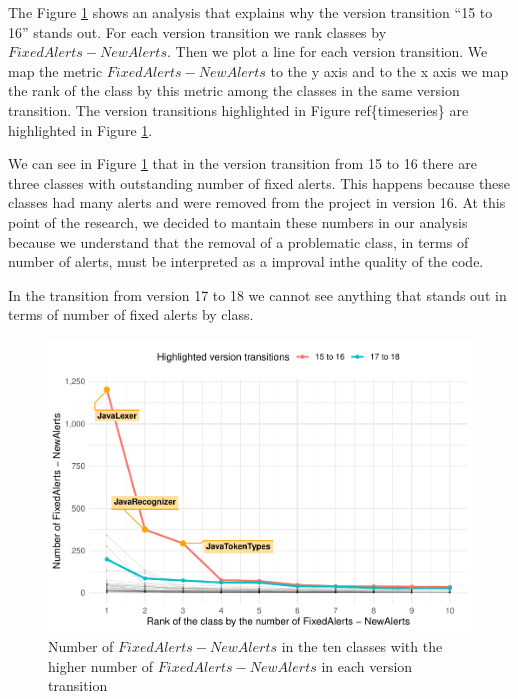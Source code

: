 \documentclass[
]{article}
\begin{document}
The Figure \ref{ouliers_analysed} shows an analysis that explains why
the version transition ``15 to 16'' stands out. For each version
transition we rank classes by \(FixedAlerts - NewAlerts\). Then we plot
a line for each version transition. We map the metric
\(FixedAlerts - NewAlerts\) to the y axis and to the x axis we map the
rank of the class by this metric among the classes in the same version
transition. The version transitions highlighted in Figure
ref\{timeseries\} are highlighted in Figure \ref{ouliers_analysed}.

We can see in Figure \ref{ouliers_analysed} that in the version
transition from 15 to 16 there are three classes with outstanding number
of fixed alerts. This happens because these classes had many alerts and
were removed from the project in version 16. At this point of the
research, we decided to mantain these numbers in our analysis because we
understand that the removal of a problematic class, in terms of number
of alerts, must be interpreted as a improval inthe quality of the code.

In the transition from version 17 to 18 we cannot see anything that
stands out in terms of number of fixed alerts by class.

\small

\normalsize

\small

\normalsize

\small

\begin{figure}
\centering
\includegraphics{report_files/figure-latex/unnamed-chunk-24-1.pdf}
\caption{\label{ouliers_analysed}Number of \(FixedAlerts - NewAlerts\)
in the ten classes with the higher number of \(FixedAlerts - NewAlerts\)
in each version transition}
\end{figure}
\end{document}
